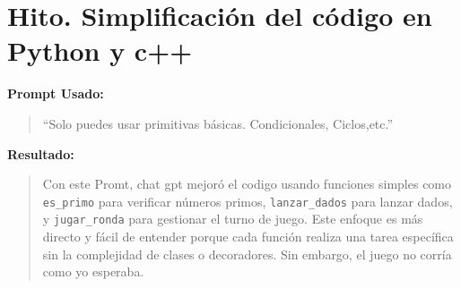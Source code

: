 \documentclass{article}
\begin{document}
\section{Hito. Simplificación del código en Python y c++}


\textbf{Prompt Usado:}

\begin{quote}
“Solo puedes usar primitivas básicas. Condicionales, Ciclos,etc.”
\end{quote}

\textbf{Resultado:}
\begin{quote}
Con este Promt, chat gpt mejoró el codigo usando funciones simples como \verb|es_primo| para verificar números primos, \verb|lanzar_dados| para lanzar dados, y \verb|jugar_ronda| para gestionar el turno de juego. Este enfoque es más directo y fácil de entender porque cada función realiza una tarea específica sin la complejidad de clases o decoradores. Sin embargo, el juego no corría como yo esperaba. 

    
\end{quote}
\end{document}
